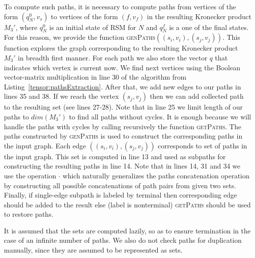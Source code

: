 To compute such paths, it is necessary to compute paths from vertices of the form $(q_N^0,v_s)$ to vertices of the form $(f, v_f)$ in the resulting Kronecker product $M_3'$, where $q_N^0$ is an initial state of RSM for $N$ and $q_N^f$ is a one of the final states.
For this reason, we provide the function \textsc{genPaths}$((s_i,v_i),(s_j,v_j))$. This function explores the graph corresponding to the resulting Kronecker product $M_3'$ in breadth first manner. For each path we also store the vector $q$ that indicates which vertex is current now. We find next vertices using the Boolean vector-matrix multiplication in line 30 of the algorithm from Listing~\ref{tensor:pathsExtraction}. After that, we add new edges to our paths in lines 35 and 38. If we reach the vertex $(s_j,v_j)$ then we can add collected path to the resulting set (see lines 27-28). Note that in line 25 we limit length of our paths to $dim(M_3')$ to find all paths without cycles. It is enough because we will handle the paths with cycles by calling recursively the function \textsc{getPaths}.
The paths constructed by \textsc{genPaths} is used to construct the corresponding paths in the input graph. Each edge $((s_i,v_i),(s_j,v_j))$ corresponds to set of paths in the input graph. This set is computed in line 13 and used as subpaths for constructing the resulting paths in line 14. Note that in lines 14, 31 and 34 we use the operation $\cdot$ 
which naturally generalizes the paths concatenation operation by constructing all possible concatenations of path pairs from given two sets. Finally, if single-edge subpath is labeled by terminal then corresponding edge should be added to the result else (label is nonterminal) \textsc{getPaths} should be used to restore paths.

It is assumed that the sets are computed lazily, so as to ensure termination in the case of an infinite number of paths.
We also do not check paths for duplication manually, since they are assumed to be represented as sets.